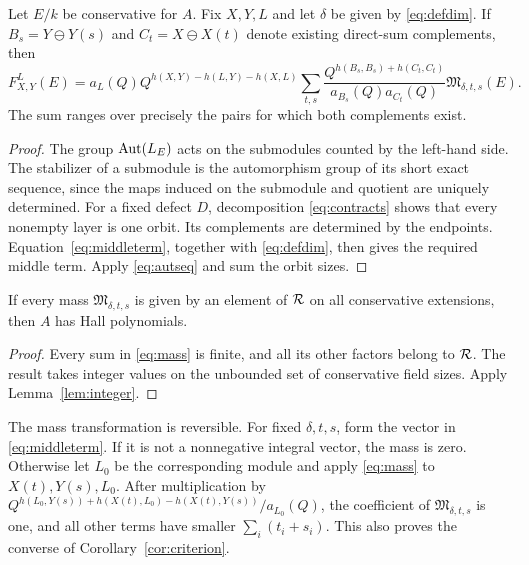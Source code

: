 \begin{proposition}\label{prop:mass}
Let $E/k$ be conservative for $A$. Fix $X,Y,L$ and let $\delta$ be given by \eqref{eq:defdim}. If $B_s=Y\ominus Y(s)$ and $C_t=X\ominus X(t)$ denote existing direct-sum complements, then
\begin{equation}\label{eq:mass}
 F^L_{X,Y}(E)=a_L(Q)Q^{h(X,Y)-h(L,Y)-h(X,L)}
 \sum_{t,s}\frac{Q^{h(B_s,B_s)+h(C_t,C_t)}}{a_{B_s}(Q)a_{C_t}(Q)}
 \mathfrak M_{\delta,t,s}(E).
\end{equation}
The sum ranges over precisely the pairs for which both complements exist.
\end{proposition}
\begin{proof}
The group $\operatorname{Aut}(L_E)$ acts on the submodules counted by the left-hand side. The stabilizer of a submodule is the automorphism group of its short exact sequence, since the maps induced on the submodule and quotient are uniquely determined. For a fixed defect $D$, decomposition \eqref{eq:contracts} shows that every nonempty layer is one orbit. Its complements are determined by the endpoints. Equation~\eqref{eq:middleterm}, together with \eqref{eq:defdim}, then gives the required middle term. Apply \eqref{eq:autseq} and sum the orbit sizes.
\end{proof}

\begin{corollary}\label{cor:criterion}
If every mass $\mathfrak M_{\delta,t,s}$ is given by an element of $\mathcal R$ on all conservative extensions, then $A$ has Hall polynomials.
\end{corollary}
\begin{proof}
Every sum in \eqref{eq:mass} is finite, and all its other factors belong to $\mathcal R$. The result takes integer values on the unbounded set of conservative field sizes. Apply Lemma~\ref{lem:integer}.
\end{proof}

The mass transformation is reversible. For fixed $\delta,t,s$, form the vector in \eqref{eq:middleterm}. If it is not a nonnegative integral vector, the mass is zero. Otherwise let $L_0$ be the corresponding module and apply \eqref{eq:mass} to $X(t),Y(s),L_0$. After multiplication by $Q^{h(L_0,Y(s))+h(X(t),L_0)-h(X(t),Y(s))}/a_{L_0}(Q)$, the coefficient of $\mathfrak M_{\delta,t,s}$ is one, and all other terms have smaller $\sum_i(t_i+s_i)$. This also proves the converse of Corollary~\ref{cor:criterion}.
